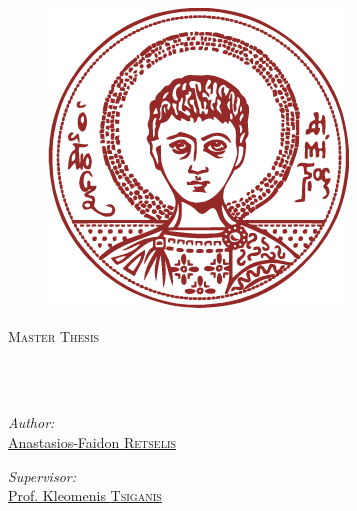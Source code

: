 \documentclass[
11pt, %
english, %
onehalfspacing, %
parskip, %
headsepline, %
]{MastersDoctoralThesis} %
\author{Anastasios-Faidon \textsc{Retselis}} %
\begin{document}
\hypersetup{urlcolor=blue}
\hypersetup{linkcolor=blue}
\hypersetup{citecolor=cyan}
\frontmatter %


\pagestyle{plain} %


\begin{titlepage}
\begin{center}

\begin{figure}[H]
\centering
\includegraphics[scale=0.4]{Figures/LogoAUTH72ppi.png}
\end{figure}

\vspace*{.04\textheight}
{\scshape\LARGE \univname\par}\vspace{1cm} %
\textsc{\Large Master Thesis}\\[0.5cm] %

\HRule \\[0.4cm] %
{\huge \bfseries \ttitle\par}\vspace{0.4cm} %
\HRule \\[1cm] %
 
\begin{minipage}[t]{0.4\textwidth}
\begin{flushleft} \large
\emph{Author:}\\
\href{https://gitlab.com/retse}{Anastasios-Faidon \textsc{Retselis}}
\end{flushleft}
\end{minipage}
\begin{minipage}[t]{0.4\textwidth}
\begin{flushright} \large
\emph{Supervisor:} \\
\href{http://users.auth.gr/tsiganis/}{Prof. Kleomenis \textsc{Tsiganis}}
\end{flushright}
\end{minipage}\\[1cm]
 

\end{center}
\end{titlepage}
\end{document}

